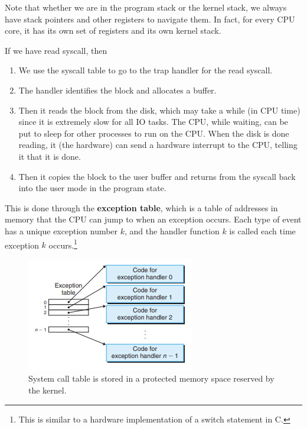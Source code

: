 \documentclass{article}
\begin{document}
    Note that whether we are in the program stack or the kernel stack, we always have stack pointers and other registers to navigate them. In fact, for every CPU core, it has its own set of registers and its own kernel stack. 

    \begin{example}
      If we have read syscall, then 
      \begin{enumerate}
        \item We use the syscall table to go to the trap handler for the read syscall. 
        \item The handler identifies the block and allocates a buffer. 
        \item Then it reads the block from the disk, which may take a while (in CPU time) since it is extremely slow for all IO tasks. The CPU, while waiting, can be put to sleep for other processes to run on the CPU. When the disk is done reading, it (the hardware) can send a hardware interrupt to the CPU, telling it that it is done. 
        \item Then it copies the block to the user buffer and returns from the syscall back into the user mode in the program state. 
      \end{enumerate}
    \end{example}

    \begin{definition}
      This is done through the \textbf{exception table}, which is a table of addresses in memory that the CPU can jump to when an exception occurs. Each type of event has a unique exception number $k$, and the handler function $k$ is called each time exception $k$ occurs.\footnote{This is similar to a hardware implementation of a switch statement in C.}
      \begin{figure}[H]
        \centering 
        \includegraphics[scale=0.4]{img/exception_table.png}
        \caption{System call table is stored in a protected memory space reserved by the kernel.} 
        \label{fig:system_call_table}
      \end{figure}
    \end{definition}
\end{document}
